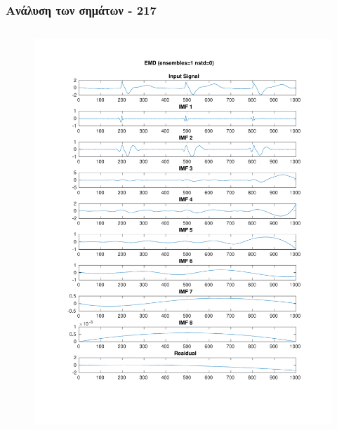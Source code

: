 \documentclass{beamer}
\begin{document}
\begin{frame}
\frametitle{Ανάλυση των σημάτων - 217}

\begin{columns}
\begin{figure}
\includegraphics[width=\textwidth]{fig/217l1_emd.pdf}
\end{figure}


\end{columns}
\end{frame}
\end{document}
